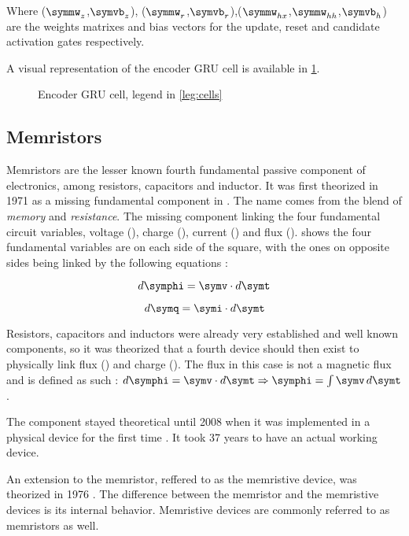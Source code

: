 Where ($\symmw_z$,$\symvb_z$), ($\symmw_r$,$\symvb_r$),($\symmw_{hx}$,$\symmw_{hh}$,$\symvb_h$) are the weights matrixes and bias vectors for the update, reset and candidate activation gates respectively.

A visual representation of the encoder \ac{GRU} cell is available in \cref{fig:encoderGruCell}.

\begin{figure}[t]
  \centering
  
  \caption{Encoder \acs{GRU} cell, legend in \cref{leg:cells}\label{fig:encoderGruCell}}
\end{figure}

\subsection{Memristors}

Memristors are the lesser known fourth fundamental passive component of electronics, among resistors, capacitors and inductor.
It was first theorized in 1971 as a missing fundamental component in \cite{TheoMemristor}. The name comes from the blend of \textit{memory} and \textit{resistance}.
The missing component linking the four fundamental circuit variables, voltage (\symv), charge (\symq), current (\symi) and flux (\symphi).  shows the four fundamental variables are on each side of the square, with the ones on opposite sides being linked by the following equations :

\begin{equation}
  d\symphi = \symv\cdot d\symt
\end{equation}

\begin{equation}
  d\symq = \symi\cdot d\symt
\end{equation}

Resistors, capacitors and inductors were already very established and well known components, so it was theorized that a fourth device should then exist to physically link flux (\symphi) and charge (\symq).  The flux in this case is not a magnetic flux and is defined as such : $ d\symphi=\symv\cdot d\symt \Rightarrow \symphi =  \int \symv \,d\symt  $.

The component stayed theoretical until 2008 when it was implemented in a physical device for the first time \cite{memristorFab}. It took 37 years to have an actual working device.

An extension to the memristor, reffered to as the memristive device, was theorized in 1976 \cite{memrestiveDev}. The difference between the memristor and the memristive devices is its internal behavior. Memristive devices are commonly referred to as memristors as well.

